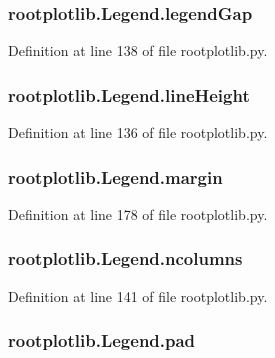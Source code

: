 \subsubsection[{legend\-Gap}]{\setlength{\rightskip}{0pt plus 5cm}rootplotlib.\-Legend.\-legend\-Gap}\label{classrootplotlib_1_1Legend_ad4fe6598570b411ea3c5504aed9fc6f2}


Definition at line 138 of file rootplotlib.\-py.

\subsubsection[{line\-Height}]{\setlength{\rightskip}{0pt plus 5cm}rootplotlib.\-Legend.\-line\-Height}\label{classrootplotlib_1_1Legend_a644d8b2db3ba2b40275386f598c63022}


Definition at line 136 of file rootplotlib.\-py.

\subsubsection[{margin}]{\setlength{\rightskip}{0pt plus 5cm}rootplotlib.\-Legend.\-margin}\label{classrootplotlib_1_1Legend_a089fbd0b9813fee9b6c77b3cc848cbd9}


Definition at line 178 of file rootplotlib.\-py.

\subsubsection[{ncolumns}]{\setlength{\rightskip}{0pt plus 5cm}rootplotlib.\-Legend.\-ncolumns}\label{classrootplotlib_1_1Legend_a28cc13738dc8872048ac1b2eaafda736}


Definition at line 141 of file rootplotlib.\-py.

\subsubsection[{pad}]{\setlength{\rightskip}{0pt plus 5cm}rootplotlib.\-Legend.\-pad}\label{classrootplotlib_1_1Legend_a9b84e9aca665747b662301bd595448f3}


